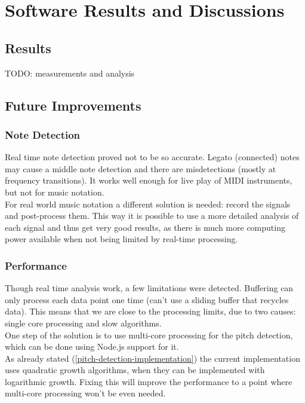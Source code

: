 \section{Software Results and Discussions}

\subsection{Results}
TODO: measurements and analysis

\subsection{Future Improvements}
\subsubsection{Note Detection}
Real time note detection proved not to be so accurate. Legato (connected) notes
may cause a middle note detection and there are misdetections (mostly at frequency
transitions). It works well enough for live play of MIDI instruments, but not
for music notation. \\
For real world music notation a different solution is needed: record the signals
and post-process them. This way it is possible to use a more detailed analysis
of each signal and thus get very good results, as there is much more computing
power available when not being limited by real-time processing.

\subsubsection{Performance}
Though real time analysis work, a few limitations were detected. Buffering can only
process each data point one time (can't use a sliding buffer that recycles data).
This means that we are close to the processing limits, due to two causes: single
core processing and slow algorithms. \\
One step of the solution is to use multi-core processing for the pitch detection,
which can be done using Node.js support for it. \\
As already stated (\autoref{pitch-detection-implementation}) the current implementation
uses quadratic growth algorithms, when they can be implemented with logarithmic
growth. Fixing this will improve the performance to a point where multi-core processing
won't be even needed.
